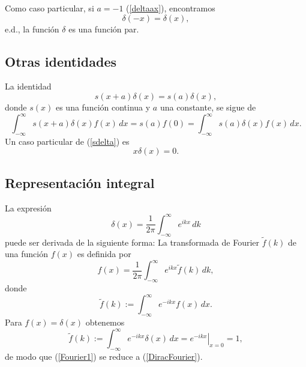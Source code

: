 Como caso particular, si $a=-1$ (\ref{deltaax}), encontramos
\begin{equation}
\boxed{\delta(-x) = \delta(x),}
\end{equation}
e.d., la función $\delta$ es una función par.

\subsection{Otras identidades}
La identidad
\begin{equation}
\boxed{s(x + a) \delta(x) = s(a) \delta(x),}\label{sdelta}
\end{equation}
donde $s(x)$ es una función continua y $a$ una constante, se sigue de
\begin{equation}
\int_{- \infty}^{\infty} s(x + a) \delta(x) f(x)\,dx = s(a) f(0) =
\int_{- \infty}^{\infty} s(a) \delta(x) f(x)\,dx .
\end{equation}
Un caso particular de (\ref{sdelta}) es
\begin{equation}
\boxed{x \delta(x) = 0 .}
\end{equation}

\subsection{Representación integral}\label{sec:DiracFourier}
La expresión
\begin{equation}
\boxed{\delta(x) = \frac{1}{2 \pi} \int_{-\infty}^{\infty} e^{i k x}\,d k}
\label{DiracFourier}
\end{equation}
puede ser derivada de la siguiente forma: La transformada de Fourier
$\tilde{f}(k)$ de una función $f(x)$ es definida por
\begin{equation}
f(x) = \frac{1}{2 \pi} \int_{- \infty}^{\infty} e^{i k x } \tilde{f}(k)\,dk ,
\label{Fourier1}
\end{equation}
donde
\begin{equation}
 \tilde{f}(k) := \int_{- \infty}^{\infty} e^{- i k x } f(x)\,dx.
\end{equation}
Para $f(x)=\delta(x)$ obtenemos
\begin{equation}
 \tilde{f}(k) := \int_{- \infty}^{\infty} e^{- i k x } \delta(x)\,dx=\left.e^{-
i k x}\right|_{x=0}=1,
\end{equation}
de modo que (\ref{Fourier1}) se reduce a (\ref{DiracFourier}).

